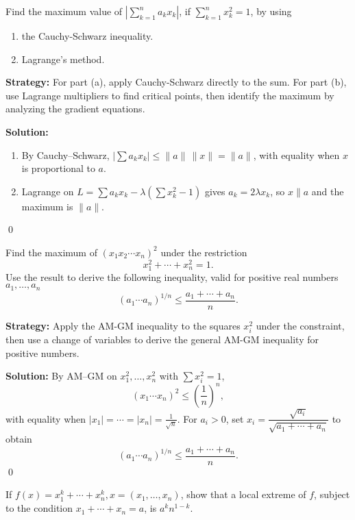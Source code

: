 \begin{problembox}
Find the maximum value of \(| \sum_{k=1}^n a_k x_k |\), if \(\sum_{k=1}^n x_k^2 = 1\), by using 
\begin{enumerate}[label=(\alph*)]
    \item the Cauchy-Schwarz inequality.
    \item Lagrange's method.
\end{enumerate}
\end{problembox}

\noindent\textbf{Strategy:} For part (a), apply Cauchy-Schwarz directly to the sum. For part (b), use Lagrange multipliers to find critical points, then identify the maximum by analyzing the gradient equations.

\bigskip\noindent\textbf{Solution:}
\begin{enumerate}[label=(\alph*)]
    \item By Cauchy--Schwarz, $\big|\sum a_k x_k\big|\le \|a\|\,\|x\|=\|a\|$, with equality when $x$ is proportional to $a$.
    \item Lagrange on $L=\sum a_k x_k-\lambda(\sum x_k^2-1)$ gives $a_k=2\lambda x_k$, so $x\parallel a$ and the maximum is $\|a\|$.
\end{enumerate}\qed


\begin{problembox}
Find the maximum of \((x_1 x_2 \cdots x_n)^2\) under the restriction
\[ x_1^2 + \cdots + x_n^2 = 1. \]
Use the result to derive the following inequality, valid for positive real numbers \(a_1, \ldots, a_n\)
\[ (a_1 \cdots a_n)^{1/n} \leq \frac{a_1 + \cdots + a_n}{n}. \]
\end{problembox}

\noindent\textbf{Strategy:} Apply the AM-GM inequality to the squares $x_i^2$ under the constraint, then use a change of variables to derive the general AM-GM inequality for positive numbers.

\bigskip\noindent\textbf{Solution:}
By AM--GM on $x_1^2,\dots,x_n^2$ with $\sum x_i^2=1$,
\[(x_1\cdots x_n)^2\le \left(\frac{1}{n}\right)^n,\]
with equality when $|x_1|=\cdots=|x_n|=\tfrac{1}{\sqrt n}$. For $a_i>0$, set $x_i=\dfrac{\sqrt{a_i}}{\sqrt{a_1+\cdots+a_n}}$ to obtain
\[(a_1\cdots a_n)^{1/n}\le \frac{a_1+\cdots+a_n}{n}.
\]\qed


\begin{problembox}
If \(f(x) = x_1^k + \cdots + x_n^k, x = (x_1, \ldots, x_n)\), show that a local extreme of \(f\), subject to the condition \(x_1 + \cdots + x_n = a\), is \(a^k n^{1-k}\).
\end{problembox}

